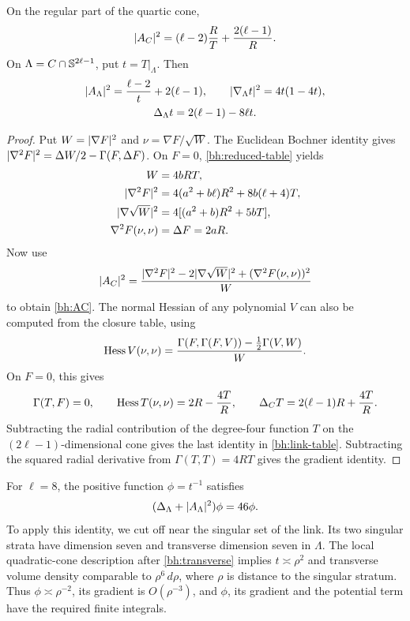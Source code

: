 \begin{lemma}\label{bh:curvature}
On the regular part of the quartic cone,
\begin{equation}\label{bh:AC}
 \lvert A_C\rvert^2=(\ell-2)\frac{R}{T}+\frac{2(\ell-1)}R.
\end{equation}
On $\Lambda=C\cap\mathbb S^{2\ell-1}$, put $t=T|_\Lambda$. Then
\begin{gather}\label{bh:link-table}
 \lvert A_\Lambda\rvert^2=\frac{\ell-2}{t}+2(\ell-1),\qquad
 \lvert \nabla_\Lambda t\rvert^2=4t(1-4t),\\
 \Delta_\Lambda t=2(\ell-1)-8\ell t.\nonumber
\end{gather}
\end{lemma}
\begin{proof}
Put $W=\lvert \nabla F\rvert^2$ and $\nu=\nabla F/\sqrt W$.
The Euclidean Bochner identity gives
$\lvert \nabla^2F\rvert^2=\Delta W/2-\Gamma(F,\Delta F)$.
On $F=0$, \eqref{bh:reduced-table} yields
\begin{align*}
 W&=4bRT,\\
 \lvert \nabla^2F\rvert^2&=4(a^2+b\ell)R^2+8b(\ell+4)T,\\
 \lvert \nabla\sqrt W\rvert^2&=4[(a^2+b)R^2+5bT],\\
 \nabla^2F(\nu,\nu)&=\Delta F=2aR.
\end{align*}
Now use
\[
 \lvert A_C\rvert^2=
 \frac{\lvert \nabla^2F\rvert^2-2\lvert \nabla\sqrt W\rvert^2
                     +(\nabla^2F(\nu,\nu))^2}{W}
\]
to obtain \eqref{bh:AC}. The normal Hessian of any polynomial $V$ can also be computed
from the closure table, using
\[
 \operatorname{Hess} V(\nu,\nu)=\frac{
 \Gamma(F,\Gamma(F,V))-\tfrac12\Gamma(V,W)}{W}.
\]
On $F=0$, this gives
\[
 \Gamma(T,F)=0,\qquad
 \operatorname{Hess} T(\nu,\nu)=2R-\frac{4T}{R},\qquad
 \Delta_C T=2(\ell-1)R+\frac{4T}{R}.
\]
Subtracting the radial contribution of the degree-four function $T$
on the $(2\ell-1)$-dimensional cone gives the last identity in
\eqref{bh:link-table}. Subtracting the squared radial derivative from
$\Gamma(T,T)=4RT$ gives the gradient identity.
\end{proof}

For $\ell=8$, the positive function $\phi=t^{-1}$ satisfies
\begin{equation}\label{bh:eigenfunction}
 (\Delta_\Lambda+\lvert A_\Lambda\rvert^2)\phi=46\phi.
\end{equation}
To apply this identity, we cut off near the singular set of the link.
Its two singular strata have dimension seven and
transverse dimension seven in $\Lambda$. The local quadratic-cone
description after \eqref{bh:transverse} implies
$t\asymp\rho^2$ and transverse volume density comparable to
$\rho^6\,d\rho$, where $\rho$ is distance to the singular stratum.
Thus $\phi\asymp\rho^{-2}$, its gradient is $O(\rho^{-3})$, and
$\phi$, its gradient and the potential term have the required
finite integrals.

